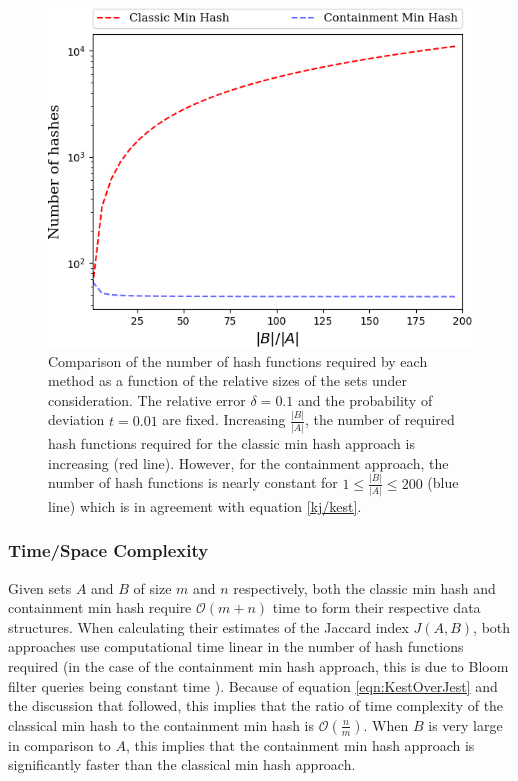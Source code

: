 \documentclass[11pt,reqno]{amsart}
\theoremstyle{remark}
\numberwithin{equation}{section}
\begin{document}
\begin{figure}[!h]%
\begin{center}
\includegraphics[width=0.75\linewidth,trim={0 0 0 0in},clip]{Figs/increasingRatioWithCont2.png}
\end{center}
\caption{Comparison of the number of hash functions required by each method as a function of the relative sizes of the sets under consideration. The relative error $\delta=0.1$ and the probability of deviation $t=0.01$ are fixed. Increasing $\frac{|B|}{|A|}$, the number of required hash functions required for the classic min hash approach is increasing (red line). However, for the containment approach, the number of hash functions is nearly constant for $1\leq\frac{|B|}{|A|}\leq 200$ (blue line) which is in agreement with equation \ref{kj/kest}.}
\label{fig:Kratio}%
\end{figure}


\subsubsection{Time/Space Complexity}
Given sets $A$ and $B$ of size $m$ and $n$ respectively, both the classic min hash and containment min hash require $\mathcal{O}(m+n)$ time to form their respective data structures. When calculating their estimates of the Jaccard index $J(A,B)$, both approaches use computational time linear in the number of hash functions required (in the case of the containment min hash approach, this is due to Bloom filter queries being constant time \cite{bloom1970space}). Because of equation \eqref{eqn:KestOverJest} and the discussion that followed, this implies that the ratio of time complexity of the classical min hash to the containment min hash is $\mathcal{O}(\frac{n}{m})$. When $B$ is very large in comparison to $A$, this implies that the containment min hash approach is significantly faster than the classical min hash approach.
\end{document}
